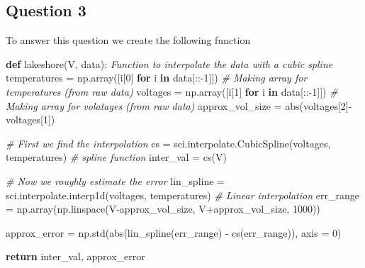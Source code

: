 \documentclass[
]{article}
\newenvironment{Shaded}{}{}
\newcommand{\BuiltInTok}[1]{#1}
\newcommand{\CommentTok}[1]{\textcolor[rgb]{0.38,0.63,0.69}{\textit{#1}}}
\newcommand{\ControlFlowTok}[1]{\textcolor[rgb]{0.00,0.44,0.13}{\textbf{#1}}}
\newcommand{\DecValTok}[1]{\textcolor[rgb]{0.25,0.63,0.44}{#1}}
\newcommand{\KeywordTok}[1]{\textcolor[rgb]{0.00,0.44,0.13}{\textbf{#1}}}
\newcommand{\NormalTok}[1]{#1}
\newcommand{\OperatorTok}[1]{\textcolor[rgb]{0.40,0.40,0.40}{#1}}
\begin{document}
\hypertarget{question-3}{%
\subsection{Question 3}\label{question-3}}

To answer this question we create the following function

\begin{Shaded}
\begin{Highlighting}[]
\KeywordTok{def}\NormalTok{ lakeshore(V, data):}
    \CommentTok{\textquotesingle{}\textquotesingle{}\textquotesingle{}Function to interpolate the data with a cubic spline\textquotesingle{}\textquotesingle{}\textquotesingle{}}
\NormalTok{    temperatures }\OperatorTok{=}\NormalTok{ np.array([i[}\DecValTok{0}\NormalTok{] }\ControlFlowTok{for}\NormalTok{ i }\KeywordTok{in}\NormalTok{ data[::}\OperatorTok{{-}}\DecValTok{1}\NormalTok{]]) }\CommentTok{\# Making array for temperatures (from raw data)}
\NormalTok{    voltages }\OperatorTok{=}\NormalTok{ np.array([i[}\DecValTok{1}\NormalTok{] }\ControlFlowTok{for}\NormalTok{ i }\KeywordTok{in}\NormalTok{ data[::}\OperatorTok{{-}}\DecValTok{1}\NormalTok{]]) }\CommentTok{\# Making array for volatages (from raw data)}
\NormalTok{    approx\_vol\_size }\OperatorTok{=} \BuiltInTok{abs}\NormalTok{(voltages[}\DecValTok{2}\NormalTok{]}\OperatorTok{{-}}\NormalTok{voltages[}\DecValTok{1}\NormalTok{])}
    
    \CommentTok{\# First we find the interpolation}
\NormalTok{    cs }\OperatorTok{=}\NormalTok{ sci.interpolate.CubicSpline(voltages, temperatures) }\CommentTok{\# spline function}
\NormalTok{    inter\_val }\OperatorTok{=}\NormalTok{ cs(V)}

    \CommentTok{\# Now we roughly estimate the error}
\NormalTok{    lin\_spline }\OperatorTok{=}\NormalTok{ sci.interpolate.interp1d(voltages, temperatures) }\CommentTok{\# Linear interpolation}
\NormalTok{    err\_range }\OperatorTok{=}\NormalTok{ np.array(np.linspace(V}\OperatorTok{{-}}\NormalTok{approx\_vol\_size, V}\OperatorTok{+}\NormalTok{approx\_vol\_size, }\DecValTok{1000}\NormalTok{))}

\NormalTok{    approx\_error }\OperatorTok{=}\NormalTok{ np.std(}\BuiltInTok{abs}\NormalTok{(lin\_spline(err\_range) }\OperatorTok{{-}}\NormalTok{ cs(err\_range)), axis }\OperatorTok{=} \DecValTok{0}\NormalTok{)}


    \ControlFlowTok{return}\NormalTok{ inter\_val, approx\_error}
\end{Highlighting}
\end{Shaded}
\end{document}
